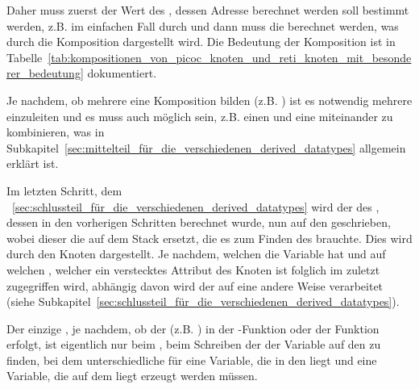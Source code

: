 Daher muss zuerst der Wert des , dessen Adresse berechnet werden soll bestimmt werden, z.B. im einfachen Fall durch  und dann muss die  berechnet werden, was durch die Komposition  dargestellt wird. Die Bedeutung der Komposition  ist in Tabelle~\ref{tab:kompositionen_von_picoc_knoten_und_reti_knoten_mit_besonderer_bedeutung} dokumentiert.

Je nachdem, ob mehrere  eine Komposition bilden (z.B. ) ist es notwendig mehrere   einzuleiten und es muss auch möglich sein, z.B. einen   und eine   miteinander zu kombinieren, was in Subkapitel~\ref{sec:mittelteil_für_die_verschiedenen_derived_datatypes} allgemein erklärt ist.

Im letzten Schritt, dem ~\ref{sec:schlussteil_für_die_verschiedenen_derived_datatypes} wird der  des , dessen  in den vorherigen Schritten berechnet wurde, nun auf den  geschrieben, wobei dieser die  auf dem Stack ersetzt, die es zum Finden des  brauchte. Dies wird durch den Knoten  dargestellt. Je nachdem, welchen  die Variable  hat und auf welchen , welcher ein \textcolor{gray!90!black}{verstecktes Attribut} des  Knoten ist folglich im  zuletzt zugegriffen wird, abhängig davon wird der   auf eine andere Weise verarbeitet (siehe Subkapitel~\ref{sec:schlussteil_für_die_verschiedenen_derived_datatypes}).

Der einzige , je nachdem, ob der  (z.B. ) in der  -Funktion oder der Funktion  erfolgt, ist eigentlich nur beim , beim Schreiben der  der Variable  auf den  zu finden, bei dem unterschiedliche  für eine Variable, die in den  liegt und eine Variable, die auf dem  liegt erzeugt werden müssen.


